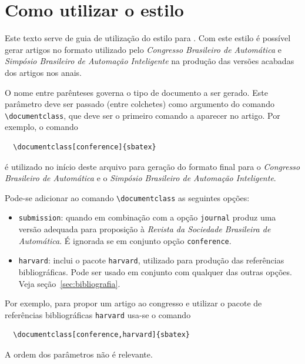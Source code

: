 \documentclass[conference,harvard,brazil,english]{sbatex}
\begin{document}


\section{Como utilizar o estilo \SBATeX}
Este texto serve de guia de utilização do estilo \SBATeX para
\LaTeXe. Com este estilo é possível gerar artigos no formato utilizado pelo \emph{Congresso
  Brasileiro de Automática} e \emph{Simpósio Brasileiro de Automação Inteligente} na produção das versões acabadas dos artigos
  nos anais.


O nome entre parênteses governa o tipo de documento a ser gerado. Este
parâmetro deve ser passado (entre colchetes) como argumento do comando
\verb+\documentclass+, que deve ser o primeiro comando a aparecer no
artigo. Por exemplo, o comando
\begin{verbatim}
  \documentclass[conference]{sbatex}
\end{verbatim}
é utilizado no início deste arquivo para geração do formato final
para o \emph{Congresso Brasileiro de Automática} e o
\emph{Simpósio Brasileiro de Automação Inteligente}.

Pode-se adicionar ao comando \verb+\documentclass+ as seguintes
opções:
\begin{itemize}
  \item \verb+submission+: quando em combinação com a opção
  \verb+journal+ produz uma versão adequada para proposição à
  \emph{Revista da Sociedade Brasileira de Automática}. É ignorada se em
  conjunto opção \verb+conference+.

  \item \verb+harvard+: inclui o pacote \verb+harvard+, utilizado para
  produção das referências bibliográficas. Pode ser usado em conjunto
  com qualquer das outras opções. Veja seção~\ref{sec:bibliografia}.
\end{itemize}
Por exemplo, para propor um artigo ao congresso e utilizar o pacote de
referências bibliográficas \verb+harvard+ usa-se o comando
\begin{verbatim}
  \documentclass[conference,harvard]{sbatex}
\end{verbatim}
A ordem dos parâmetros não é relevante.
\end{document}

